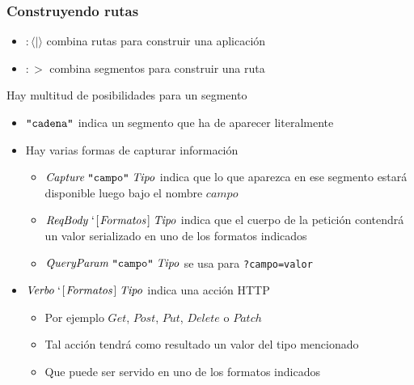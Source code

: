 \documentclass{beamer}
\newcommand{\Conid}[1]{\mathit{#1}}
\newcommand{\Varid}[1]{\mathit{#1}}
\begin{document}
\begin{frame}[fragile]
\frametitle{Construyendo rutas}
\begin{itemize}
\item \ensuremath{: \! \! \langle | \rangle} combina rutas para construir una aplicación
\item \ensuremath{: \! >} combina segmentos para construir una ruta
\end{itemize}
Hay multitud de posibilidades para un segmento
\begin{itemize}
\item \ensuremath{\text{\tt \char34 cadena\char34}} indica un segmento que ha de aparecer literalmente
\item Hay varias formas de capturar información
\begin{itemize}
\item \ensuremath{\Conid{Capture}\;\text{\tt \char34 campo\char34}\;\Conid{Tipo}} indica que lo que aparezca en ese segmento estará disponible luego bajo el nombre \ensuremath{\Varid{campo}}
\item \ensuremath{\Conid{ReqBody}\;` \!\;[\mskip1.5mu \Conid{Formatos}\mskip1.5mu]\;\Conid{Tipo}} indica que el cuerpo de la petición contendrá un valor serializado en uno de los formatos indicados
\item \ensuremath{\Conid{QueryParam}\;\text{\tt \char34 campo\char34}\;\Conid{Tipo}} se usa para {\tt ?campo=valor}
\end{itemize}
\item \ensuremath{\Conid{Verbo}\;` \!\;[\mskip1.5mu \Conid{Formatos}\mskip1.5mu]\;\Conid{Tipo}} indica una acción HTTP
\begin{itemize}
\item Por ejemplo \ensuremath{\Conid{Get}}, \ensuremath{\Conid{Post}}, \ensuremath{\Conid{Put}}, \ensuremath{\Conid{Delete}} o \ensuremath{\Conid{Patch}}
\item Tal acción tendrá como resultado un valor del tipo mencionado
\item Que puede ser servido en uno de los formatos indicados
\end{itemize}
\end{itemize}
\end{frame}
\end{document}
